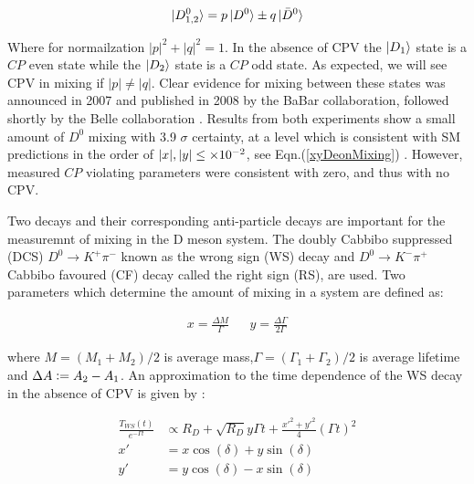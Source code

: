 \begin{equation}\label{DeonLinComb}
\ket{D^{0}_{1,2}} = p \ket{D^{0}} \pm q \ket{\bar{D}^{0}}
\end{equation}

\noindent Where for normailzation $|p|^{2}+|q|^{2} = 1$. In the absence of CPV the $\ket{D_{1}}$ state is a $CP$ even state while the $\ket{D_{2}}$ state is a $CP$ odd state. As expected, we will see CPV in mixing if $|p| \neq |q|$. Clear evidence for mixing between these states was announced in 2007 and published in 2008 by the BaBar collaboration, followed shortly by the Belle collaboration \cite{BabarD0mixing}\cite{BelleD0mixing}. Results from both experiments show a small amount of $D^{0}$ mixing with 3.9 $\sigma$ certainty, at a level which is consistent with SM predictions in the order of $|x|,|y| \leq \times 10^{-2}$, see Eqn.(\ref{xyDeonMixing}) \cite{Babar_D0_Review}. However, measured $CP$ violating parameters were consistent with zero, and thus with no CPV.

Two decays and their corresponding anti-particle decays are important for the measuremnt of mixing in the D meson system. The doubly Cabbibo suppressed (DCS) $D^{0} \rightarrow K^{+} \pi^{-}$ known as the wrong sign (WS) decay and $D^{0} \rightarrow K^{-} \pi^{+}$ Cabbibo favoured (CF) decay called the right sign (RS), are used. Two parameters which determine the amount of mixing in a system are defined as:

\begin{align}\label{xyDeonMixing}
x = \frac{\Delta M}{\Gamma} & & y = \frac{\Delta \Gamma}{2 \Gamma}
\end{align}

\noindent where $M= (M_{1}+M_{2})/2$ is average mass,$\Gamma = (\Gamma_{1}+\Gamma_{2})/2$ is average lifetime and $\Delta A \vcentcolon= A_{2} - A_{1}$. An approximation to the time dependence of the WS decay in the absence of CPV is given by \cite{BabarD0mixing}:

\begin{align*}
\frac{T_{WS}(t)}{e^{-\Gamma t}} & \propto R_{D} + \sqrt{R_{D}} y \Gamma t + \frac{{x'}^2 + {y'}^2}{4} (\Gamma t)^{2} \\
                             x' & = x \cos (\delta) + y \sin (\delta)\\
                             y' & = y \cos (\delta) - x \sin (\delta)
\end{align*}

